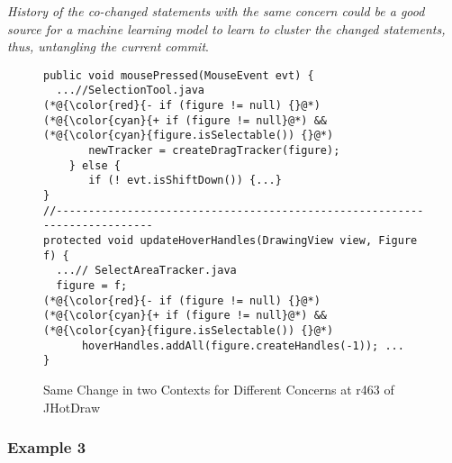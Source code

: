 

\vspace{3pt}
 {\em
  History of the co-changed statements with the same concern could be
  a good source for a machine learning model to learn to cluster the
  changed statements, thus, untangling the current commit}.

\begin{figure}[t]
	\centering
	\begin{lstlisting}[]
public void mousePressed(MouseEvent evt) { 
  ...//SelectionTool.java
(*@{\color{red}{- if (figure != null) {}@*)
(*@{\color{cyan}{+ if (figure != null}@*) && (*@{\color{cyan}{figure.isSelectable()) {}@*)
       newTracker = createDragTracker(figure);
    } else {
       if (! evt.isShiftDown()) {...}
}
//--------------------------------------------------------------------------
protected void updateHoverHandles(DrawingView view, Figure f) {
  ...// SelectAreaTracker.java
  figure = f;
(*@{\color{red}{- if (figure != null) {}@*)
(*@{\color{cyan}{+ if (figure != null}@*) && (*@{\color{cyan}{figure.isSelectable()) {}@*)
      hoverHandles.addAll(figure.createHandles(-1)); ...
}
	\end{lstlisting}
        \vspace{-15pt}
        \caption{Same Change in two Contexts for Different Concerns at r463 of JHotDraw}
        \label{fig:motiv-context}
\end{figure}


\subsubsection{Example 3}

